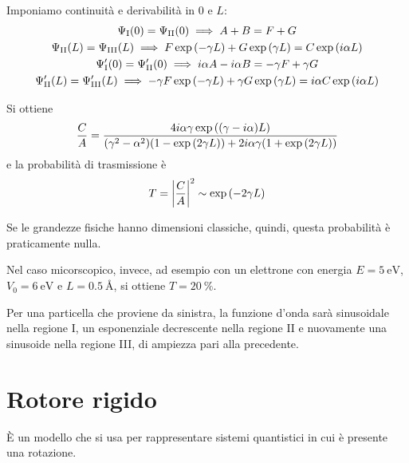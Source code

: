 Imponiamo continuità e derivabilità in $0$ e $L$:
\begin{gather}
    \Psi_\mathrm{I}(0) = \Psi_\mathrm{II}(0)
    \implies A + B = F + G \\
    \Psi_\mathrm{II}(L) = \Psi_\mathrm{III}(L)
    \implies F \operatorname{exp}\left( -\gamma L \right) + G \operatorname{exp}\left( \gamma L \right) = C \operatorname{exp}\left( i \alpha L \right) \\
    \Psi_\mathrm{I}'(0) = \Psi_\mathrm{II}'(0) \implies
    i \alpha A - i \alpha B = -\gamma F + \gamma G \\
    \Psi_\mathrm{II}'(L) = \Psi_\mathrm{III}'(L) \implies
    -\gamma F \operatorname{exp}\left( -\gamma L \right) + \gamma G \operatorname{exp}\left( \gamma L \right) = i \alpha C \operatorname{exp}\left( i \alpha L \right)
\end{gather}


Si ottiene
\begin{equation}
    \frac{C}{A} = \frac{4 i \alpha \gamma \operatorname{exp}\left( (\gamma - i \alpha) L \right)}{(\gamma^2 - \alpha^2) (1 - \operatorname{exp}\left( 2 \gamma L \right)) + 2 i \alpha \gamma (1 + \operatorname{exp}\left( 2 \gamma L \right))}
\end{equation}
e la probabilità di trasmissione è
\begin{gather}
    T = \left\lvert \frac{C}{A} \right\rvert^2 \sim \operatorname{exp}\left( -2 \gamma L \right)
\end{gather}

Se le grandezze fisiche hanno dimensioni classiche, quindi, questa probabilità è praticamente nulla.

Nel caso micorscopico, invece, ad esempio con un elettrone con energia $E = \qty{5}{\electronvolt}$, $V_0 = \qty{6}{\electronvolt}$ e $L = \qty{0.5}{\angstrom}$, si ottiene $T = \qty{20}{\percent}$.

Per una particella che proviene da sinistra, la funzione d'onda sarà sinusoidale nella regione I, un esponenziale decrescente nella regione II e nuovamente una sinusoide nella regione III, di ampiezza pari alla precedente.

\section{Rotore rigido}

È un modello che si usa per rappresentare sistemi quantistici in cui è presente una rotazione.

